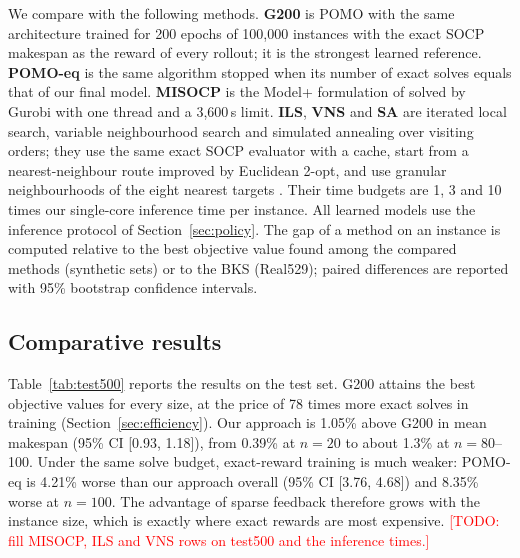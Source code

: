 \documentclass[preprint,review,12pt,authoryear]{elsarticle}
\newcommand{\todo}[1]{\textcolor{red}{[TODO: #1]}}
\begin{document}
We compare with the following methods. \textbf{G200} is POMO with the same architecture trained for 200 epochs of
100{,}000 instances with the exact SOCP makespan as the reward of every rollout; it is the strongest learned
reference. \textbf{POMO-eq} is the same algorithm stopped when its number of exact solves equals that of our
final model. \textbf{MISOCP} is the Model+ formulation of \citet{li2025exact} solved by Gurobi with one thread
and a 3{,}600\,s limit. \textbf{ILS}, \textbf{VNS} and \textbf{SA} are iterated local search, variable neighbourhood
search and simulated annealing over visiting orders; they use the same exact SOCP evaluator with a cache, start
from a nearest-neighbour route improved by Euclidean 2-opt, and use granular neighbourhoods of the eight nearest
targets \citep{toth2003granular}. Their time budgets are 1, 3 and 10 times our single-core inference time per
instance. All learned models use the inference protocol of Section~\ref{sec:policy}. The gap of a method on an
instance is computed relative to the best objective value found among the compared methods (synthetic sets) or to
the BKS (Real529); paired differences are reported with 95\% bootstrap confidence intervals.

\subsection{Comparative results}\label{sec:synthetic}
Table~\ref{tab:test500} reports the results on the test set. G200 attains the best objective values for every
size, at the price of 78 times more exact solves in training (Section~\ref{sec:efficiency}). Our approach is
1.05\% above G200 in mean makespan (95\% CI [0.93, 1.18]), from 0.39\% at $n=20$ to about 1.3\% at $n=80$--100.
Under the same solve budget, exact-reward training is much weaker: POMO-eq is 4.21\% worse than our approach
overall (95\% CI [3.76, 4.68]) and 8.35\% worse at $n=100$. The advantage of sparse feedback therefore grows
with the instance size, which is exactly where exact rewards are most expensive. \todo{fill MISOCP, ILS and VNS
rows on test500 and the inference times.}
\end{document}
